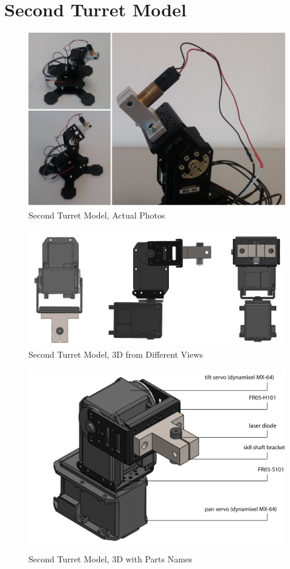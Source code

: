 \section{Second Turret Model}\label{sec:turret64}
\begin{figure}
	\centering
	\includegraphics[width=\textwidth]{img/model2Photo.png}%
	\caption{Second Turret Model, Actual Photos}
	\label{fig:model2Photo}
\end{figure}
\begin{figure}
	\centering
	\includegraphics[width=\textwidth]{img/model23dsides.png}%
	\caption{Second Turret Model, 3D from Different Views}
	\label{fig:model23D}
\end{figure}
\begin{figure}
	\centering
	\includegraphics[width=\textwidth]{img/model23dCap.png}%
	\caption{Second Turret Model, 3D with Parts Names}
	\label{fig:model23DCap}
\end{figure}
